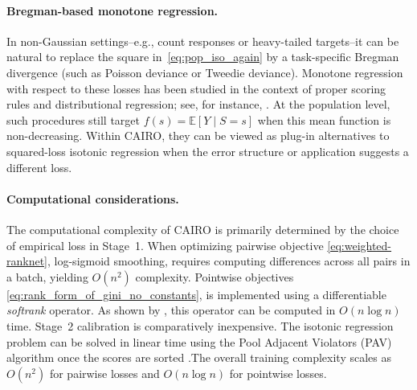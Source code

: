 \documentclass[11pt]{article}
\theoremstyle{plain}
\theoremstyle{plain}
\theoremstyle{plain}
\theoremstyle{plain}
\theoremstyle{plain}
\theoremstyle{plain}
\theoremstyle{plain}
\begin{document}
\paragraph{Bregman-based monotone regression.}
In non-Gaussian settings--e.g., count responses or heavy-tailed targets--it can be natural to replace the square in~\eqref{eq:pop_iso_again} by a task-specific Bregman divergence (such as Poisson deviance or Tweedie deviance). 
Monotone regression with respect to these losses has been studied in the context of proper scoring rules and distributional regression; see, for instance, \citet{jordan2023isotonic,henzi2021isotonic}.  
At the population level, such procedures still target $f(s)=\mathbb E[Y\mid S=s]$ when this mean function is non-decreasing.  
Within \textsc{CAIRO}, they can be viewed as plug-in alternatives to squared-loss isotonic regression when the error structure or application suggests a different loss.
\fi

\paragraph{Computational considerations.}
The computational complexity of \textsc{CAIRO} is primarily determined by the choice of empirical loss in Stage~1. When optimizing pairwise objective \eqref{eq:weighted-ranknet}, log-sigmoid smoothing, requires computing differences across all pairs in a batch, yielding $O(n^2)$ complexity. Pointwise objectives \eqref{eq:rank_form_of_gini_no_constants}, is implemented using a differentiable \textit{softrank} operator. As shown by \citet{blondel2020fast}, this operator can be computed in $O(n \log n)$ time. 
Stage~2 calibration is comparatively inexpensive. The isotonic regression problem can be solved in linear time using the Pool Adjacent Violators (PAV) algorithm once the scores are sorted \citep{barlow1972statistical}.The overall training complexity scales as $O(n^2)$ for pairwise losses and $O(n \log n)$ for pointwise losses.
\end{document}
